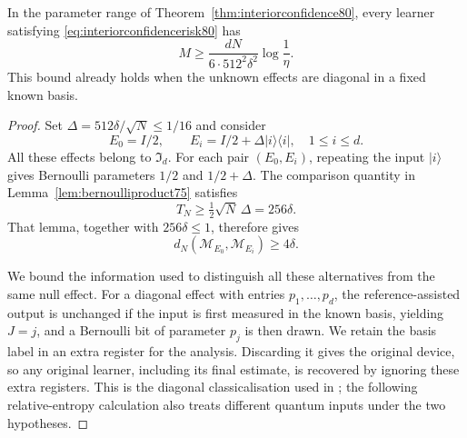 \begin{lemma}
\label{lem:diagonalconfidence80}
In the parameter range of Theorem~\ref{thm:interiorconfidence80},
every learner satisfying \eqref{eq:interiorconfidencerisk80} has
\begin{equation}\label{eq:diagonalconfidence80}
 M\ge\frac{dN}{6\cdot512^2\delta^2}\log\frac1\eta.
\end{equation}
This bound already holds when the unknown effects are diagonal in
a fixed known basis.
\end{lemma}
\begin{proof}
Set $\Delta=512\delta/\sqrt N\le1/16$ and consider
\[
 E_0=I/2,\qquad E_i=I/2+\Delta|i\rangle\langle i|,
 \quad 1\le i\le d.
\]
All these effects belong to $\mathfrak I_d$.  For each pair
$(E_0,E_i)$, repeating the input $|i\rangle$ gives Bernoulli
parameters $1/2$ and $1/2+\Delta$.  The comparison quantity in
Lemma~\ref{lem:bernoulliproduct75} satisfies
\[
 T_N\ge\tfrac12\sqrt N\,\Delta=256\delta.
\]
That lemma, together with $256\delta\le1$, therefore gives
\begin{equation}\label{eq:diagonalseparation80}
 d_N(\mathcal M_{E_0},\mathcal M_{E_i})\ge4\delta.
\end{equation}

We bound the information used to distinguish all these alternatives
from the same null effect.  For a diagonal effect with entries
$p_1,\ldots,p_d$, the reference-assisted output is unchanged if
the input is first measured in the known basis, yielding $J=j$,
and a Bernoulli bit of parameter $p_j$ is then drawn.  We retain
the basis label in an extra register for the analysis.  Discarding
it gives the original device, so any original learner, including
its final estimate, is recovered by ignoring these extra registers.
This is the diagonal classicalisation used in
\cite[Lemma~IV.19]{MB67}; the following relative-entropy calculation
also treats different quantum inputs under the two hypotheses.


\end{proof}

